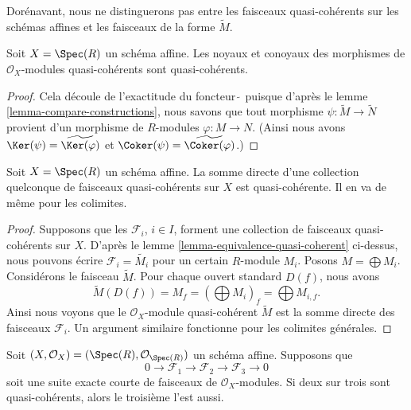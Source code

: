 \noindent
Dorénavant, nous ne distinguerons pas entre les faisceaux quasi-cohérents
sur les schémas affines et les faisceaux de la forme $\widetilde M$.

\begin{lemma}
\label{lemma-kernel-cokernel-quasi-coherent}
Soit $X = \Spec(R)$ un schéma affine. Les
noyaux et conoyaux des morphismes de $\mathcal{O}_X$-modules
quasi-cohérents sont quasi-cohérents.
\end{lemma}

\begin{proof}
Cela découle de l'exactitude du foncteur $\widetilde{\ }$ puisque d'après
le lemme \ref{lemma-compare-constructions}, nous savons que tout morphisme
$\psi : \widetilde{M} \to \widetilde{N}$ provient d'un
morphisme de $R$-modules $\varphi : M \to N$. (Ainsi
nous avons $\Ker(\psi) = \widetilde{\Ker(\varphi)}$
et $\Coker(\psi) = \widetilde{\Coker(\varphi)}$.)
\end{proof}

\begin{lemma}
\label{lemma-colimit-quasi-coherent}
Soit $X = \Spec(R)$ un schéma affine. La somme
directe d'une collection quelconque de faisceaux quasi-cohérents sur $X$
est quasi-cohérente. Il en va de même pour les colimites.
\end{lemma}

\begin{proof}
Supposons que les $\mathcal{F}_i$, $i \in I$, forment une collection de faisceaux
quasi-cohérents sur $X$. D'après le lemme \ref{lemma-equivalence-quasi-coherent}
ci-dessus, nous pouvons écrire $\mathcal{F}_i = \widetilde{M_i}$ pour un certain $R$-module
$M_i$. Posons $M = \bigoplus M_i$. Considérons le faisceau $\widetilde{M}$.
Pour chaque ouvert standard $D(f)$, nous avons
$$
\widetilde{M}(D(f)) = M_f =
\left(\bigoplus M_i\right)_f =
\bigoplus M_{i, f}.
$$
Ainsi nous voyons que le $\mathcal{O}_X$-module quasi-cohérent
$\widetilde{M}$ est la somme directe des faisceaux $\mathcal{F}_i$. Un argument
similaire fonctionne pour les colimites générales.
\end{proof}

\begin{lemma}
\label{lemma-extension-quasi-coherent}
Soit $(X, \mathcal{O}_X) = (\Spec(R), \mathcal{O}_{\Spec(R)})$
un schéma affine. Supposons que
$$
0 \to
\mathcal{F}_1 \to
\mathcal{F}_2 \to
\mathcal{F}_3 \to
0
$$
soit une suite exacte courte de faisceaux de $\mathcal{O}_X$-modules. Si
deux sur trois sont quasi-cohérents, alors le troisième l'est aussi.
\end{lemma}

